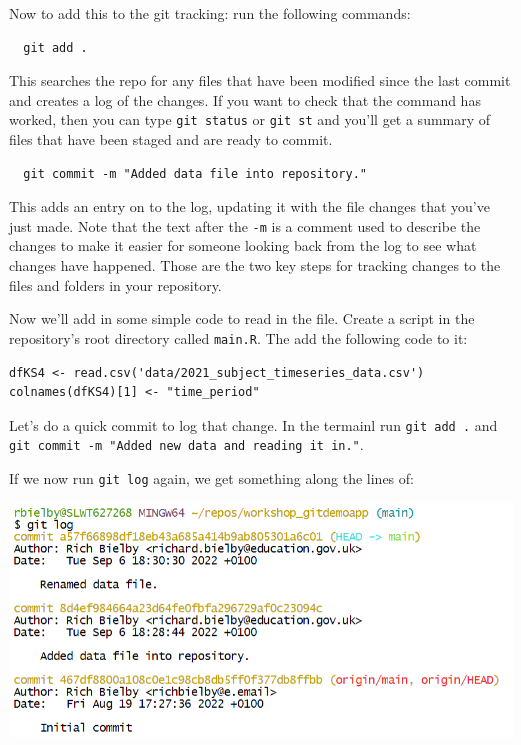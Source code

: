 \documentclass[
  12pt,
]{article}
\begin{document}
Now to add this to the git tracking: run the following commands:

\begin{verbatim}
  git add .
\end{verbatim}

This searches the repo for any files that have been modified since the
last commit and creates a log of the changes. If you want to check that
the command has worked, then you can type \texttt{git\ status} or
\texttt{git\ st} and you'll get a summary of files that have been staged
and are ready to commit.

\begin{verbatim}
  git commit -m "Added data file into repository."
\end{verbatim}

This adds an entry on to the log, updating it with the file changes that
you've just made. Note that the text after the \texttt{-m} is a comment
used to describe the changes to make it easier for someone looking back
from the log to see what changes have happened. Those are the two key
steps for tracking changes to the files and folders in your repository.

Now we'll add in some simple code to read in the file. Create a script
in the repository's root directory called \texttt{main.R}. The add the
following code to it:

\begin{verbatim}
dfKS4 <- read.csv('data/2021_subject_timeseries_data.csv')
colnames(dfKS4)[1] <- "time_period"
\end{verbatim}

Let's do a quick commit to log that change. In the termainl run
\texttt{git\ add\ .} and
\texttt{git\ commit\ -m\ "Added\ new\ data\ and\ reading\ it\ in."}.

If we now run \texttt{git\ log} again, we get something along the lines
of:

\begin{center}\includegraphics[width=0.8\linewidth]{images/gitdemo/gitdemo-gitlog-2} \end{center}
\end{document}
